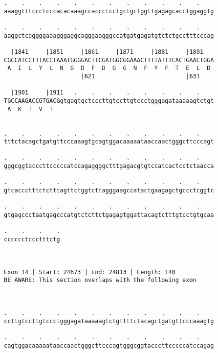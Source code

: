 \documentclass{article}
\begin{document}
\begin{Verbatim}
.    .    .    .    .    .    .    .    .    .    .    .    
aaaggtttccctcccacacaaagccaccctcctgctgctggttgagagcacctggaggtg
                                                            
.    .    .    .    .    .    .    .    .    .    .    .    
aaggctcaggggaaagggaggcagggaagggccatgatgagatgtctctgcctttcccag
                                                            
  |1841     |1851     |1861     |1871     |1881     |1891   
CGCCATCCTTTACCTAAATGGGGACTTCGATGGCGGAAACTTTTATTTCACTGAACTGGA
 A  I  L  Y  L  N  G  D  F  D  G  G  N  F  Y  F  T  E  L  D 
                      |621                          |631    
  
  |1901     |1911   .    .    .    .    .    .    .    .    
TGCCAAGACCGTGACGgtgagtgctcccttgtccttgtccctgggagataaaaagtctgt
 A  K  T  V  T                                              
                                                            
  
.    .    .    .    .    .    .    .    .    .    .    .    
tttctacagctgatgttcccaaagtgcagtggacaaaaataaccaactgggcttcccagt
                                                            
.    .    .    .    .    .    .    .    .    .    .    .    
gggcggtacccttcccccatccagaggggctttgagacgtgtccatcactcctctaacca
                                                            
.    .    .    .    .    .    .    .    .    .    .    .    
gtcaccctttctctttagttctggtcttagggaagccatactgaagagctgccctcggtc
                                                            
.    .    .    .    .    .    .    .    .    .    .    .    
gtgagccctaatgagcccatgtctcttctgagagtggattacagtctttgtcctgtgcaa
                                                            
.    .    .    .
cccccctccctttctg
                
                
 
Exon 14 | Start: 24673 | End: 24813 | Length: 140
BE AWARE: This section overlaps with the following exon



.    .    .    .    .    .    .    .    .    .    .    .    
ccttgtccttgtccctgggagataaaaagtctgttttctacagctgatgttcccaaagtg
                                                            
.    .    .    .    .    .    .    .    .    .    .    .    
cagtggacaaaaataaccaactgggcttcccagtgggcggtacccttcccccatccagag
                                                            

\end{Verbatim}
\end{document}
